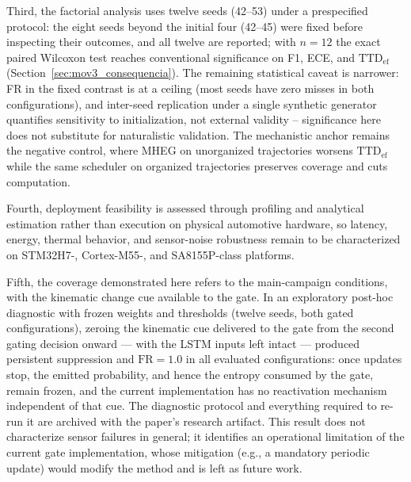 \documentclass[a4paper,fleqn]{cas-dc}
\newcommand{\MHEG}{\mbox{MHEG}\xspace}
\begin{document}
{\color{\revcolor}Third, the factorial analysis uses twelve seeds (42--53)
under a prespecified protocol: the eight seeds beyond the initial four
(42--45) were fixed before inspecting their outcomes, and all twelve
are reported; with $n=12$ the exact paired
Wilcoxon test reaches conventional significance on F1, ECE, and
$\mathrm{TTD}_{\mathrm{ef}}$ (Section~\ref{sec:mov3_consequencia}). The
remaining statistical caveat is narrower: FR in the fixed contrast is at a
ceiling (most seeds have zero misses in both configurations), and inter-seed
replication under a single synthetic generator quantifies sensitivity to
initialization, not external validity -- significance here does not substitute
for naturalistic validation. The mechanistic anchor remains the negative
control, where \MHEG on unorganized trajectories worsens
$\mathrm{TTD}_{\mathrm{ef}}$ while the same scheduler on organized
trajectories preserves coverage and cuts computation.}

Fourth, deployment feasibility is assessed through profiling and
analytical estimation rather than execution on physical automotive hardware, so
latency, energy, thermal behavior, and sensor-noise robustness remain to be
characterized on STM32H7-, Cortex-M55-, and SA8155P-class platforms.

{\color{\revcolor}Fifth, the coverage demonstrated here refers to the
main-campaign conditions, with the kinematic change cue available to the
gate. In an exploratory post-hoc diagnostic with frozen weights and
thresholds (twelve seeds, both gated configurations), zeroing the kinematic
cue delivered to the gate from the second gating decision onward --- with the
LSTM inputs left intact --- produced persistent suppression and
$\mathrm{FR}=1.0$ in all evaluated configurations: once updates stop, the
emitted probability, and hence the entropy consumed by the gate, remain
frozen, and the current implementation has no reactivation mechanism
independent of that cue. The diagnostic protocol and everything required to
re-run it are archived with the paper's research artifact. This result does not characterize sensor failures in
general; it identifies an operational limitation of the current gate
implementation, whose mitigation (e.g., a mandatory periodic update) would
modify the method and is left as future work.}
\end{document}
